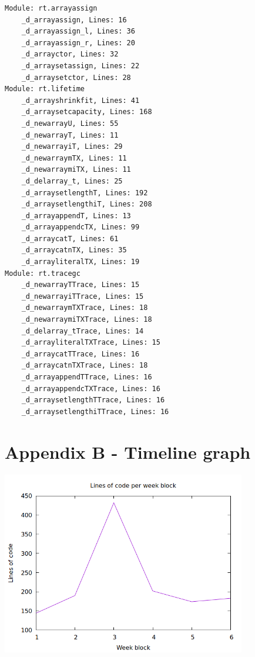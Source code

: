 \documentclass[10pt,a4paper]{article}
\begin{document}
\small
\begin{verbatim}
Module: rt.arrayassign
    _d_arrayassign, Lines: 16
    _d_arrayassign_l, Lines: 36
    _d_arrayassign_r, Lines: 20
    _d_arrayctor, Lines: 32
    _d_arraysetassign, Lines: 22
    _d_arraysetctor, Lines: 28
Module: rt.lifetime
    _d_arrayshrinkfit, Lines: 41
    _d_arraysetcapacity, Lines: 168
    _d_newarrayU, Lines: 55
    _d_newarrayT, Lines: 11
    _d_newarrayiT, Lines: 29
    _d_newarraymTX, Lines: 11
    _d_newarraymiTX, Lines: 11
    _d_delarray_t, Lines: 25
    _d_arraysetlengthT, Lines: 192
    _d_arraysetlengthiT, Lines: 208
    _d_arrayappendT, Lines: 13
    _d_arrayappendcTX, Lines: 99
    _d_arraycatT, Lines: 61
    _d_arraycatnTX, Lines: 35
    _d_arrayliteralTX, Lines: 19
Module: rt.tracegc
    _d_newarrayTTrace, Lines: 15
    _d_newarrayiTTrace, Lines: 15
    _d_newarraymTXTrace, Lines: 18
    _d_newarraymiTXTrace, Lines: 18
    _d_delarray_tTrace, Lines: 14
    _d_arrayliteralTXTrace, Lines: 15
    _d_arraycatTTrace, Lines: 16
    _d_arraycatnTXTrace, Lines: 18
    _d_arrayappendTTrace, Lines: 16
    _d_arrayappendcTXTrace, Lines: 16
    _d_arraysetlengthTTrace, Lines: 16
    _d_arraysetlengthiTTrace, Lines: 16
\end{verbatim}

\section{Appendix B - Timeline graph}
\label{appendix:timelinegraph}
\begin{center}
\includegraphics[height=8cm]{WeekValue}
\end{center}
\end{document}
